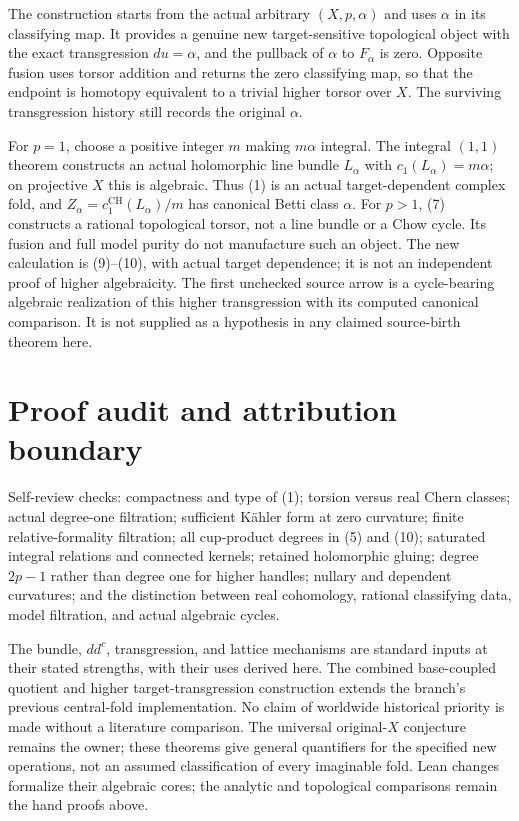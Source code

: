 \documentclass[11pt]{article}
\begin{document}
The construction starts from the actual arbitrary $(X,p,\alpha)$ and uses
$\alpha$ in its classifying map. It provides a genuine new target-sensitive
topological object with the exact transgression $du=\alpha$, and the
pullback of $\alpha$ to $F_\alpha$ is zero. Opposite fusion uses torsor
addition and returns the zero classifying map, so that the endpoint is
homotopy equivalent to a trivial higher torsor over $X$. The surviving
transgression history still records the original $\alpha$.

For $p=1$, choose a positive integer $m$ making $m\alpha$ integral.
The integral $(1,1)$ theorem constructs an actual holomorphic line bundle
$L_\alpha$ with $c_1(L_\alpha)=m\alpha$; on projective $X$ this is algebraic.
Thus (1) is an actual target-dependent complex fold, and
$Z_\alpha=c_1^{\mathrm{CH}}(L_\alpha)/m$ has canonical Betti class $\alpha$.
For $p>1$, (7) constructs a rational topological torsor, not a line bundle
or a Chow cycle. Its fusion and full model purity do not manufacture such
an object. The new calculation is (9)--(10), with actual target dependence;
it is not an independent proof of higher algebraicity. The first unchecked
source arrow is a cycle-bearing algebraic realization of this higher
transgression with its computed canonical comparison. It is not supplied
as a hypothesis in any claimed source-birth theorem here.

\section{Proof audit and attribution boundary}
Self-review checks: compactness and type of (1); torsion versus real Chern
classes; actual degree-one filtration; sufficient K\"ahler form at zero
curvature; finite relative-formality filtration; all cup-product degrees in
(5) and (10); saturated integral relations and connected kernels; retained
holomorphic gluing; degree $2p-1$ rather than degree one for higher handles;
nullary and dependent curvatures; and the distinction between real cohomology,
rational classifying data, model filtration, and actual algebraic cycles.

The bundle, $dd^c$, transgression, and lattice mechanisms are standard inputs
at their stated strengths, with their uses derived here. The combined
base-coupled quotient and higher target-transgression construction extends
the branch's previous central-fold implementation. No claim of worldwide
historical priority is made without a literature comparison. The universal
original-$X$ conjecture remains the owner; these theorems give general
quantifiers for the specified new operations, not an assumed classification
of every imaginable fold. Lean changes formalize their algebraic cores;
the analytic and topological comparisons remain the hand proofs above.
\end{document}
